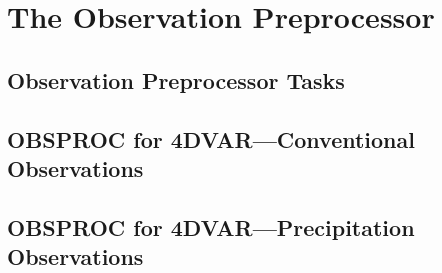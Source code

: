 
\chapter{The Observation Preprocessor} %

\section{Observation Preprocessor Tasks}

\section{OBSPROC for 4DVAR---Conventional Observations}

\section{OBSPROC for 4DVAR---Precipitation Observations}

\ifpdf
    \graphicspath{{X/figures/PNG/}{X/figures/PDF/}{X/figures/}}
\else
    \graphicspath{{X/figures/EPS/}{X/figures/}}
\fi









